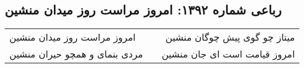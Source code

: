 \begin{center}
\section*{رباعی شماره ۱۳۹۲: امروز مراست روز میدان منشین}
\label{sec:1392}
\begin{longtable}{l p{0.5cm} r}
امروز مراست روز میدان منشین
&&
میتاز چو گوی پیش چوگان منشین
\\
مردی بنمای و همچو حیران منشین
&&
امروز قیامت است ای جان منشین
\\
\end{longtable}
\end{center}
